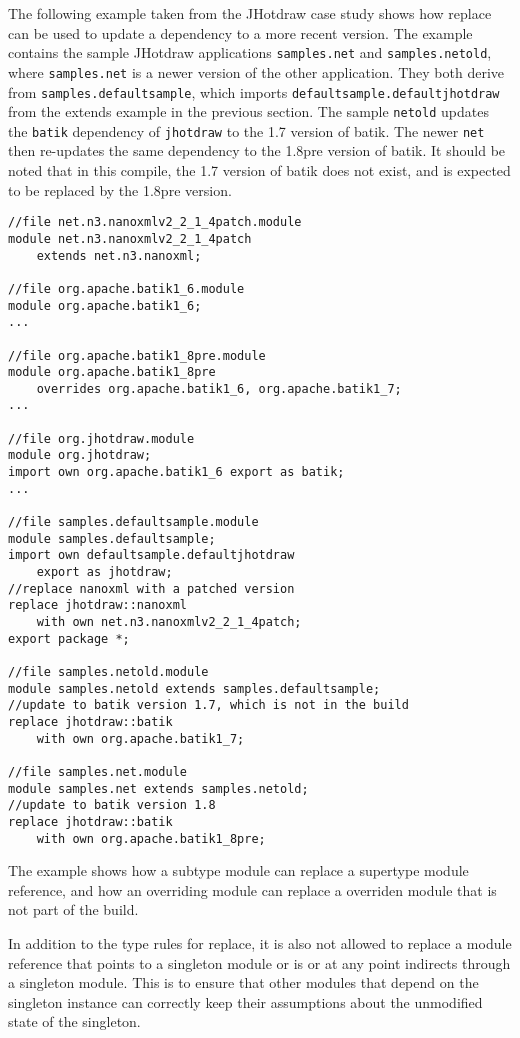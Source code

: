 The following example taken from the JHotdraw case study shows how replace can
be used to update a dependency to a more recent version. The example contains
the sample JHotdraw applications \texttt{samples.net} and \texttt{samples.netold}, 
where \texttt{samples.net} is a newer version of the other application. They both 
derive from \texttt{samples.defaultsample}, which imports \texttt{defaultsample.defaultjhotdraw} 
from the extends example in the previous section. The sample \texttt{netold} updates 
the \texttt{batik} dependency of \texttt{jhotdraw} to the 1.7 version of batik.
The newer \texttt{net} then re-updates the same dependency to the 1.8pre version of batik.
It should be noted that in this compile, the 1.7 version of batik does not exist, and
is expected to be replaced by the 1.8pre version.

\begin{lstlisting}[caption=Replace]
//file net.n3.nanoxmlv2_2_1_4patch.module
module net.n3.nanoxmlv2_2_1_4patch 
	extends net.n3.nanoxml;

//file org.apache.batik1_6.module
module org.apache.batik1_6;
...

//file org.apache.batik1_8pre.module
module org.apache.batik1_8pre 
	overrides org.apache.batik1_6, org.apache.batik1_7;
...

//file org.jhotdraw.module
module org.jhotdraw;
import own org.apache.batik1_6 export as batik;
...

//file samples.defaultsample.module
module samples.defaultsample;
import own defaultsample.defaultjhotdraw 
	export as jhotdraw;
//replace nanoxml with a patched version
replace jhotdraw::nanoxml 
	with own net.n3.nanoxmlv2_2_1_4patch;
export package *;

//file samples.netold.module
module samples.netold extends samples.defaultsample;
//update to batik version 1.7, which is not in the build
replace jhotdraw::batik 
	with own org.apache.batik1_7;

//file samples.net.module
module samples.net extends samples.netold;
//update to batik version 1.8
replace jhotdraw::batik
	with own org.apache.batik1_8pre;
\end{lstlisting}

The example shows how a subtype module can replace a supertype module
reference, and how an overriding module can replace a overriden module
that is not part of the build.

In addition to the type rules for replace, it is also not allowed to 
replace a module reference that points to a singleton module or
is or at any point indirects through a singleton module. This is to ensure that other
modules that depend on the singleton instance can correctly keep their
assumptions about the unmodified state of the singleton.

